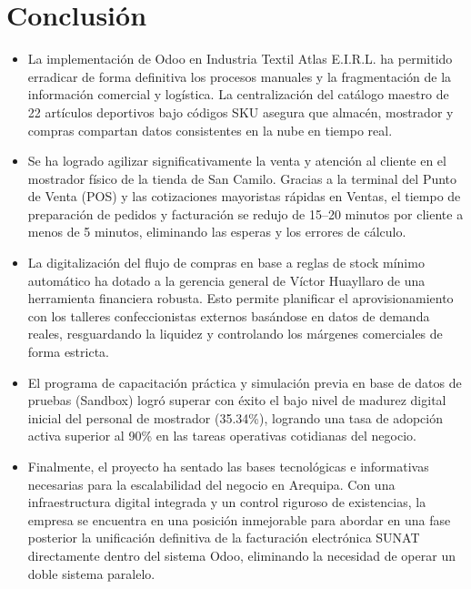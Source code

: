 \section{Conclusión}

\begin{itemize}
    \item La implementación de Odoo en Industria Textil Atlas E.I.R.L. ha permitido erradicar de forma definitiva los procesos manuales y la fragmentación de la información comercial y logística. La centralización del catálogo maestro de 22 artículos deportivos bajo códigos SKU asegura que almacén, mostrador y compras compartan datos consistentes en la nube en tiempo real.
    \item Se ha logrado agilizar significativamente la venta y atención al cliente en el mostrador físico de la tienda de San Camilo. Gracias a la terminal del Punto de Venta (POS) y las cotizaciones mayoristas rápidas en Ventas, el tiempo de preparación de pedidos y facturación se redujo de 15--20 minutos por cliente a menos de 5 minutos, eliminando las esperas y los errores de cálculo.
    \item La digitalización del flujo de compras en base a reglas de stock mínimo automático ha dotado a la gerencia general de Víctor Huayllaro de una herramienta financiera robusta. Esto permite planificar el aprovisionamiento con los talleres confeccionistas externos basándose en datos de demanda reales, resguardando la liquidez y controlando los márgenes comerciales de forma estricta.
    \item El programa de capacitación práctica y simulación previa en base de datos de pruebas (Sandbox) logró superar con éxito el bajo nivel de madurez digital inicial del personal de mostrador (35.34\%), logrando una tasa de adopción activa superior al 90\% en las tareas operativas cotidianas del negocio.
    \item Finalmente, el proyecto ha sentado las bases tecnológicas e informativas necesarias para la escalabilidad del negocio en Arequipa. Con una infraestructura digital integrada y un control riguroso de existencias, la empresa se encuentra en una posición inmejorable para abordar en una fase posterior la unificación definitiva de la facturación electrónica SUNAT directamente dentro del sistema Odoo, eliminando la necesidad de operar un doble sistema paralelo.
\end{itemize}
